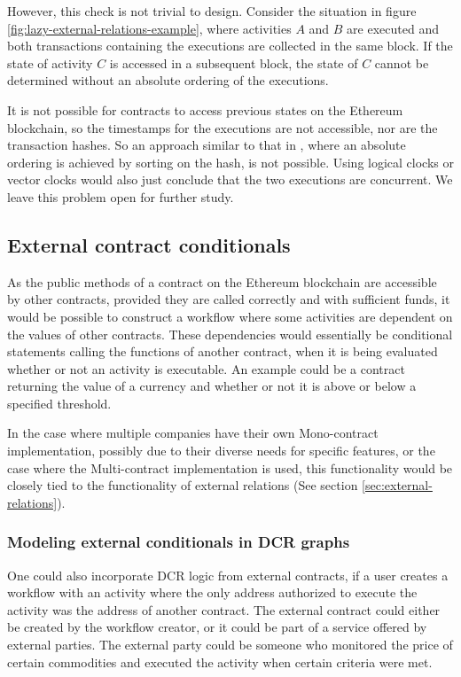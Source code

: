 \documentclass{article}
\begin{document}
			However, this check is not trivial to design.
			Consider the situation in figure \ref{fig:lazy-external-relations-example}, where activities $A$ and $B$ are executed and both transactions containing the executions are collected in the same block. If the state of activity $C$ is accessed in a subsequent block, the state of $C$ cannot be determined without an absolute ordering of the executions.

			It is not possible for contracts to access previous states on the Ethereum blockchain, so the timestamps for the executions are not accessible, nor are the transaction hashes. 
			So an approach similar to that in \cite{bachelor}, where an absolute ordering is achieved by sorting on the hash, is not possible.
			Using logical clocks or vector clocks would also just conclude that the two executions are concurrent.
			We leave this problem open for further study.

		\subsection{External contract conditionals}
		As the public methods of a contract on the Ethereum blockchain are accessible by other contracts, provided they are called correctly and with sufficient funds, it would be possible to construct a workflow where some activities are dependent on the values of other contracts.
		These dependencies would essentially be conditional statements calling the functions of another contract, when it is being evaluated whether or not an activity is executable. 
		An example could be a contract returning the value of a currency and whether or not it is above or below a specified threshold.

		In the case where multiple companies have their own Mono-contract implementation, possibly due to their diverse needs for specific features, or the case where the Multi-contract implementation is used, this functionality would be closely tied to the functionality of external relations (See section \ref{sec:external-relations}).

			\subsubsection{Modeling external conditionals in DCR graphs}
			One could also incorporate DCR logic from external contracts, if a user creates a workflow with an activity where the only address authorized to execute the activity was the address of another contract.
			The external contract could either be created by the workflow creator, or it could be part of a service offered by external parties.
			The external party could be someone who monitored the price of certain commodities and executed the activity when certain criteria were met.
			
\end{document}
